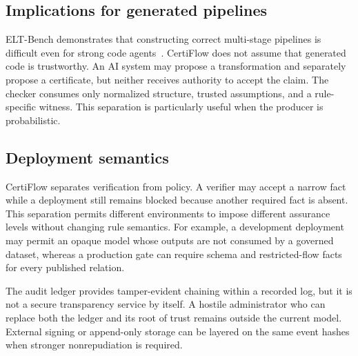 \subsection{Implications for generated pipelines}

ELT-Bench demonstrates that constructing correct multi-stage pipelines is difficult even for strong code agents~\cite{jin2025eltbench}. CertiFlow does not assume that generated code is trustworthy. An AI system may propose a transformation and separately propose a certificate, but neither receives authority to accept the claim. The checker consumes only normalized structure, trusted assumptions, and a rule-specific witness. This separation is particularly useful when the producer is probabilistic.

\subsection{Deployment semantics}

CertiFlow separates verification from policy. A verifier may accept a narrow fact while a deployment still remains blocked because another required fact is absent. This separation permits different environments to impose different assurance levels without changing rule semantics. For example, a development deployment may permit an opaque model whose outputs are not consumed by a governed dataset, whereas a production gate can require schema and restricted-flow facts for every published relation.

The audit ledger provides tamper-evident chaining within a recorded log, but it is not a secure transparency service by itself. A hostile administrator who can replace both the ledger and its root of trust remains outside the current model. External signing or append-only storage can be layered on the same event hashes when stronger nonrepudiation is required.
